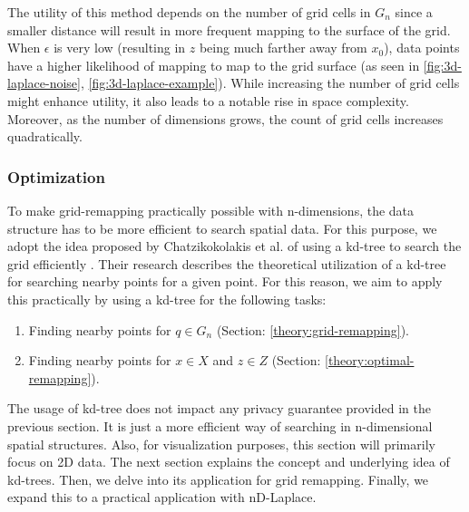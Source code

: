  \newline

The utility of this method depends on the number of grid cells in $G_n$ since a smaller distance will result in more frequent mapping to the surface of the grid.
When $\epsilon$ is very low (resulting in $z$ being much farther away from $x_0$), data points have a higher likelihood of mapping to map to the grid surface 
(as seen in \ref{fig:3d-laplace-noise}, \ref{fig:3d-laplace-example}). 
While increasing the number of grid cells might enhance utility, it also leads to a notable rise in space complexity. 
Moreover, as the number of dimensions grows, the count of grid cells increases quadratically.

\subsubsection{Optimization}
To make grid-remapping practically possible with n-dimensions, the data structure has to be more efficient to search spatial data. For this purpose, we adopt the idea proposed by Chatzikokolakis et al. of using a kd-tree to search the grid efficiently \citep{chatzikokolakis_efficient_2017}.
Their research describes the theoretical utilization of a kd-tree for searching nearby points for a given point.
For this reason, we aim to apply this practically by using a kd-tree for the following tasks:
\begin{enumerate}
  \item Finding nearby points for $q \in G_n$ (Section: \ref{theory:grid-remapping}).
  \item Finding nearby points for $x \in X$ and $z \in Z$ (Section: \ref{theory:optimal-remapping}).
\end{enumerate}
The usage of kd-tree does not impact any privacy guarantee provided in the previous section. It is just a more efficient way of searching in n-dimensional spatial structures. Also, for visualization purposes, this section will primarily focus on 2D data. \newline
The next section explains the concept and underlying idea of kd-trees.
Then, we delve into its application for grid remapping.
Finally, we expand this to a practical application with nD-Laplace.
\newpage
